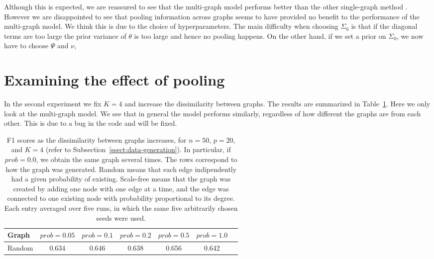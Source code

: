 \documentclass[a4paper, 11pt, oneside]{report}
\newcommand{\1}{\mathds{1}}
\begin{document}
Although this is expected, we are reassured to see that the multi-graph model
performs better than the other single-graph method \citep{mein2006}.
However we are disappointed to see that pooling information across graphs
seems to have provided no benefit to the performance of the multi-graph model.
We think this is due to the choice of hyperparameters.
The main difficulty when choosing $\Sigma_0$ is that if the diagonal terms are too large
the prior variance of $\theta$ is too large and hence no pooling happens.
On the other hand, if we set a prior on $\Sigma_0$, we now have to choose 
$\Psi$ and $\nu$,


\section{Examining the effect of pooling}\label{sect:perf-self}
In the second experiment we fix $K=4$ and increase the dissimilarity between graphs.
The results are summarized in Table~\ref{tab:mg-more-random}.
Here we only look at the multi-graph model.
We see that in general the model performs similarly,
regardless of how different the graphs are from each other.
This is due to a bug in the code and will be fixed.

\begin{table}[ht]
	\caption{F1 scores as the dissimilarity between graphs increases, for $n=50$, $p=20$, and $K=4$ (refer to Subsection~\ref{ssect:data-generation}).
		In particular, if $prob = 0.0$, we obtain the same graph several times.
		The rows correspond to how the graph was generated.
		Random means that each edge indipendently had a given probability of existing.
		Scale-free means that the graph was created by adding one node with one edge at a time, and the edge was connected to one existing node with probability proportional to its degree.
		Each entry averaged over five runs, in which the same five arbitrarily chosen seeds were used.
	}
	\label{tab:mg-more-random}
	\begin{center}
		\begin{tabular}[c]{l|cccccc}
			\toprule
			Graph  & $prob = 0.05$ & $prob = 0.1$ & $prob = 0.2$ & $prob = 0.5$ & $prob = 1.0$ \\
			\midrule
			Random & 0.634         & 0.646        & 0.638        & 0.656        & 0.642        \\
			\bottomrule
		\end{tabular}
	\end{center}
\end{table}
\end{document}
